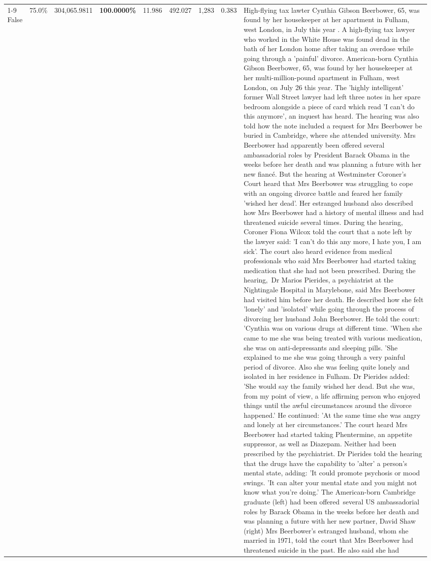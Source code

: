 \begin{table}[H]
\begin{tabular}{lllrlllll}
\cline{1-9}
False & 75.0\% & \color{red} 304,065.9811 & \bfseries \color{red} 100.0000\% & 11.986 & 492.027 & 1,283 & 0.383 & High-flying tax lawter Cynthia Gibson Beerbower, 65, was found by her housekeeper at her apartment in Fulham, west London, in July this year . A high-flying tax lawyer who worked in the White House was found dead in the bath of her London home after taking an overdose while going through a 'painful' divorce. American-born Cynthia Gibson Beerbower, 65, was found by her housekeeper at her multi-million-pound apartment in Fulham, west London, on July 26 this year. The 'highly intelligent' former Wall Street lawyer had left three notes in her spare bedroom alongside a piece of card which read 'I can't do this anymore', an inquest has heard. The hearing was also told how the note included a request for Mrs Beerbower be buried in Cambridge, where she attended university. Mrs Beerbower had apparently been offered several ambassadorial roles by President Barack Obama in the weeks before her death and was planning a future with her new fiancé. But the hearing at Westminster Coroner's Court heard that Mrs Beerbower was struggling to cope with an ongoing divorce battle and feared her family 'wished her dead'. Her estranged husband also described how Mrs Beerbower had a history of mental illness and had threatened suicide several times. During the hearing, Coroner Fiona Wilcox told the court that a note left by the lawyer said: 'I can't do this any more, I hate you, I am sick'. The court also heard evidence from medical professionals who said Mrs Beerbower had started taking medication that she had not been prescribed. During the hearing, Dr Marios Pierides, a psychiatrist at the Nightingale Hospital in Marylebone, said Mrs Beerbower had visited him before her death. He described how she felt 'lonely' and 'isolated' while going through the process of divorcing her husband John Beerbower. He told the court: 'Cynthia was on various drugs at different time. 'When she came to me she was being treated with various medication, she was on anti-depressants and sleeping pills. 'She explained to me she was going through a very painful period of divorce. Also she was feeling quite lonely and isolated in her residence in Fulham. Dr Pierides added: 'She would say the family wished her dead. But she was, from my point of view, a life affirming person who enjoyed things until the awful circumstances around the divorce happened.' He continued: 'At the same time she was angry and lonely at her circumstances.' The court heard Mrs Beerbower had started taking Phentermine, an appetite suppressor, as well as Diazepam. Neither had been prescribed by the psychiatrist. Dr Pierides told the hearing that the drugs have the capability to 'alter' a person's mental state, adding: 'It could promote psychosis or mood swings. 'It can alter your mental state and you might not know what you're doing.' The American-born Cambridge graduate (left) had been offered several US ambassadorial roles by Barack Obama in the weeks before her death and was planning a future with her new partner, David Shaw (right) Mrs Beerbower's estranged husband, whom she married in 1971, told the court that Mrs Beerbower had threatened suicide in the past. He also said she had 
\end{tabular}
\end{table}
